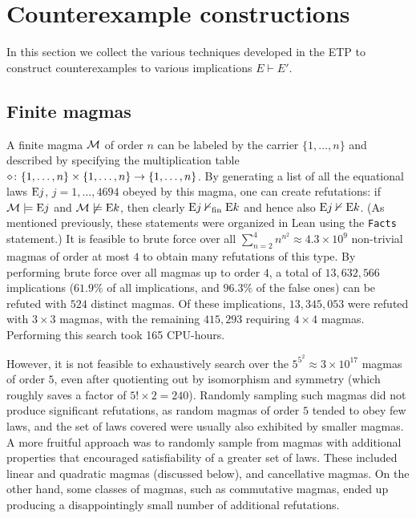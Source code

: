 
\section{Counterexample constructions}

In this section we collect the various techniques developed in the ETP to construct counterexamples to various implications $E \vdash E'$.

\subsection{Finite magmas}\label{finite-sec}

A finite magma ${\mathcal{M}}$ of order $n$ can be labeled by the carrier $\{1,\dots,n\}$ and described by specifying the multiplication table $\diamond \colon \{1,\dots,n\} \times \{1,\dots,n\} \to \{1,\dots,n\}$.  By generating a list of all the equational laws $\mathrm{E}j$, $j=1,\dots,4694$ obeyed by this magma, one can create refutations: if ${\mathcal{M}} \models \mathrm{E}j$ and ${\mathcal{M}} \not \models \mathrm{E}k$, then clearly $\mathrm{E}j \nvdash_{\mathrm{fin}} \mathrm{E}k$ and hence also $\mathrm{E}j \nvdash \mathrm{E}k$.  (As mentioned previously, these statements were organized in Lean using the \texttt{Facts} statement.) It is feasible to brute force over all $\sum_{n=2}^4 n^{n^2} \approx 4.3 \times 10^9$ non-trivial magmas of order at most $4$ to obtain many refutations of this type.
By performing brute force over all magmas up to order $4$, a total of $13,632,566$ implications ($61.9\%$ of all implications, and $96.3\%$ of the false ones) can be refuted with $524$ distinct magmas. Of these implications, $13,345,053$ were refuted with $3 \times 3$ magmas, with the remaining $415,293$ requiring $4 \times 4$ magmas. Performing this search took 165 CPU-hours.

However, it is not feasible to exhaustively search over the $5^{5^2} \approx 3 \times 10^{17}$ magmas of order $5$, even after quotienting out by isomorphism and symmetry (which roughly saves a factor of $5! \times 2 = 240$).  Randomly sampling such magmas did not produce significant refutations, as random magmas of order $5$ tended to obey few laws, and the set of laws covered were usually also exhibited by smaller magmas.  A more fruitful approach was to randomly sample from magmas with additional properties that encouraged satisfiability of a greater set of laws.  These included linear and quadratic magmas (discussed below), and cancellative magmas.  On the other hand, some classes of magmas, such as commutative magmas, ended up producing a disappointingly small number of additional refutations.

